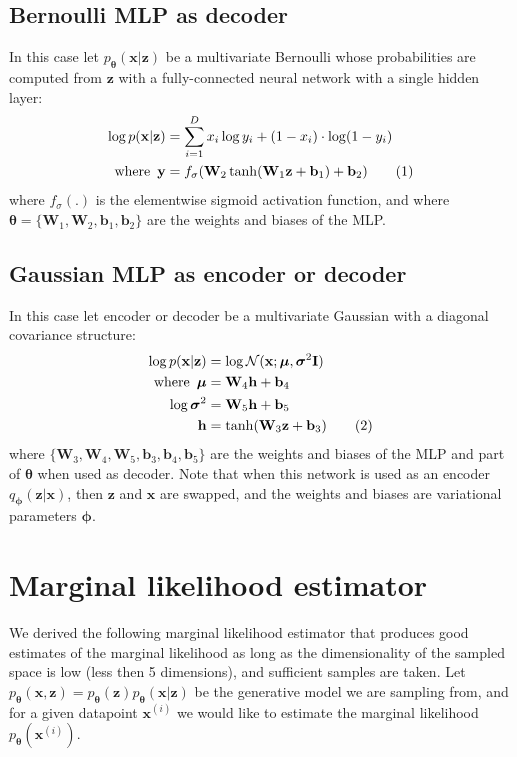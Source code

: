 \documentclass{article} %
\theoremstyle{definition}
\newcommand{\bb}[1]{\mathbf{#1}}
\newcommand{\bbb}{\bb{b}}
\newcommand{\bx}{\bb{x}}
\newcommand{\bxi}{\bx^{(i)}}
\newcommand{\by}{\bb{y}}
\newcommand{\bh}{\bb{h}}
\newcommand{\bz}{\bb{z}}
\newcommand{\bT}{\boldsymbol{\theta}}
\newcommand{\bphi}{\boldsymbol{\phi}}
\newcommand{\bsigma}{\boldsymbol{\sigma}}
\newcommand{\bmu}{\boldsymbol{\mu}}
\newcommand{\bW}{\bb{W}}
\newcommand{\bI}{\bb{I}}
\newcommand{\pT}{p_{\bT}}
\newcommand{\qPhi}{q_{\bphi}}
\newcommand{\eqnr}{\addtocounter{equation}{1}\tag{\theequation}}
\theoremstyle{definition}
\begin{document}
\subsection{Bernoulli MLP as decoder}
In this case let $\pT(\bx|\bz)$ be a multivariate Bernoulli whose probabilities are computed from $\bz$ with a fully-connected neural network with a single hidden layer:
\begin{align*}
\log p(\bx|\bz)
&= \sum_{i=1}^D x_i \log y_i + (1-x_i) \cdot \log(1-y_i) \\
\text{where\,\,\,}
\by &= f_\sigma(\bW_2 \tanh(\bW_1 \bz + \bbb_1) + \bbb_2)
\eqnr\end{align*}
where $f_\sigma(.)$ is the elementwise sigmoid activation function, and where $\bT = \{\bW_1, \bW_2, \bbb_1, \bbb_2\}$ are the weights and biases of the MLP.

\subsection{Gaussian MLP as encoder or decoder}
In this case let encoder or decoder be a multivariate Gaussian with a diagonal covariance structure:
\begin{align*}
\log p(\bx|\bz)
&= \log \mathcal{N}(\bx; \bmu, \bsigma^2 \bI)
\\
\text{where\,\,\,}
\bmu &= \bW_4 \bh  +\bbb_4 \\
\log \bsigma^2 &= \bW_5 \bh + \bbb_5 \\
\bh &= \tanh(\bW_3 \bz + \bbb_3)
\eqnr\end{align*}
where $\{\bW_3, \bW_4, \bW_5, \bbb_3, \bbb_4, \bbb_5 \}$ are the weights and biases of the MLP and part of $\bT$ when used as decoder. Note that when this network is used as an encoder $\qPhi(\bz|\bx)$, then $\bz$ and $\bx$ are swapped, and the weights and biases are variational parameters $\bphi$.

\section{Marginal likelihood estimator}
We derived the following marginal likelihood estimator that produces good estimates of the marginal likelihood as long as the dimensionality of the sampled space is low (less then 5 dimensions), and sufficient samples are taken.  Let $\pT(\bx, \bz) = \pT(\bz) \pT(\bx|\bz)$ be the generative model we are sampling from, and for a given datapoint $\bxi$ we would like to estimate the marginal likelihood $\pT(\bxi)$.
\end{document}
